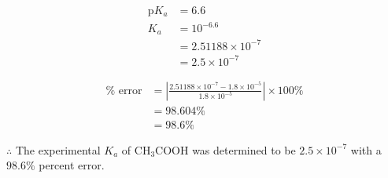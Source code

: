 \documentclass{article}
\begin{document}
\noindent
\begin{minipage}[t]{0.45\textwidth}
    \begin{align*}
        \text{p}K_a &= 6.6 \\
        K_a &= 10^{-6.6} \\
        &= 2.51188 \times 10^{-7} \\
        &= 2.5 \times 10^{-7}
    \end{align*}
\end{minipage}
\hfill
\begin{minipage}[t]{0.45\textwidth}
    \begin{align*}
        \% \text{ error} &= \left| \frac{2.51188 \times 10^{-7} - 1.8 \times 10^{-5}}{1.8 \times 10^{-5}} \right| \times 100\% \\
        &= 98.604\% \\
        &= 98.6\%
    \end{align*}
\end{minipage}

\vspace{0.1in}
$\therefore$ The experimental $K_a$ of CH$_3$COOH was determined to be $2.5 \times 10^{-7}$ with a $98.6\%$ percent error.




\end{document}
